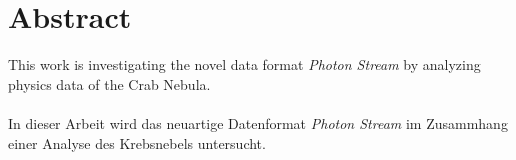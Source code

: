\chapter{Abstract}

This work is investigating the novel data format \textit{Photon Stream} by
analyzing physics data of the Crab Nebula.
\\
\\
In dieser Arbeit wird das neuartige Datenformat \textit{Photon Stream} im
Zusammhang einer Analyse des Krebsnebels untersucht.
